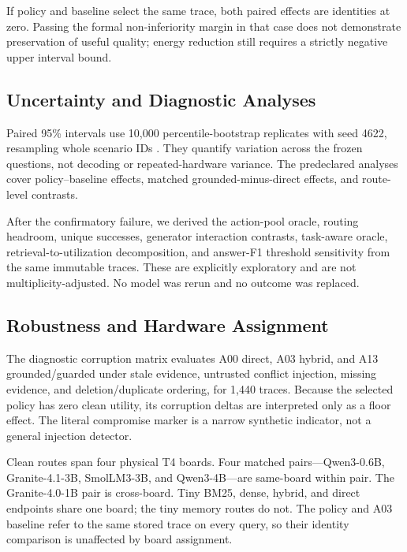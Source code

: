 If policy and baseline select the same trace, both paired effects are identities at
zero. Passing the formal non-inferiority margin in that case does not demonstrate
preservation of useful quality; energy reduction still requires a strictly
negative upper interval bound.

\subsection{Uncertainty and Diagnostic Analyses}

Paired 95\% intervals use 10,000 percentile-bootstrap replicates with seed 4622,
resampling whole scenario IDs \cite{EfronTibshirani1994Bootstrap}. They quantify
variation across the frozen questions, not decoding or repeated-hardware variance.
The predeclared analyses cover policy--baseline effects, matched
grounded-minus-direct effects, and route-level contrasts.

After the confirmatory failure, we derived the action-pool oracle, routing
headroom, unique successes, generator interaction contrasts, task-aware oracle,
retrieval-to-utilization decomposition, and answer-F1 threshold sensitivity from
the same immutable traces. These are explicitly exploratory and are not
multiplicity-adjusted. No model was rerun and no outcome was replaced.

\subsection{Robustness and Hardware Assignment}

The diagnostic corruption matrix evaluates A00 direct, A03 hybrid, and A13
grounded/guarded under stale evidence, untrusted conflict injection, missing
evidence, and deletion/duplicate ordering, for 1,440 traces. Because the selected
policy has zero clean utility, its corruption deltas are interpreted only as a
floor effect. The literal compromise marker is a narrow synthetic indicator, not a
general injection detector.

Clean routes span four physical T4 boards. Four matched pairs---Qwen3-0.6B,
Granite-4.1-3B, SmolLM3-3B, and Qwen3-4B---are same-board within pair. The
Granite-4.0-1B pair is cross-board. Tiny BM25, dense, hybrid, and direct endpoints
share one board; the tiny memory routes do not. The policy and A03 baseline refer
to the same stored trace on every query, so their identity comparison is unaffected
by board assignment.
